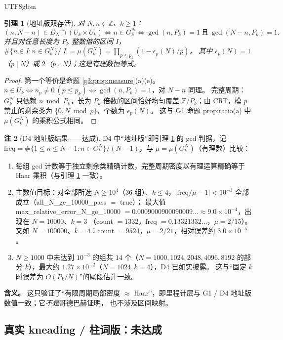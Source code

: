 \documentclass[11pt,a4paper]{article}
\newcommand{\Haar}{\mu}
\newcommand{\status}[1]{\par\noindent\fbox{\textbf{状态：#1}}\par\smallskip}
\theoremstyle{plain}
\newtheorem{lem}{引理}[section]
\theoremstyle{definition}
\newtheorem{rem}[lem]{注}
\begin{document}
\begin{CJK}{UTF8}{gbsn}
\begin{lem}[地址版双存活]\label{g3:lem:address}
对 $N,n\in\mathbb Z$、$k\ge1$：
\[
(n,N-n)\in D_N\cap(U_k\times U_k)\iff n\in G_k^N\iff \gcd(n,P_k)=1\ \text{且}\ \gcd(N-n,P_k)=1 .
\]
并且对任意长度为 $P_k$ 整数倍的区间 $I$，$\#\{n\in I:n\in G_k^N\}/|I|=\Haar(G_k^N)=\prod_{p\le p_k}(1-\epsilon_p(N)/p)$，
其中 $\epsilon_p(N)=1$（$p\mid N$）或 $2$（$p\nmid N$）；这是有理数恒等式。
\end{lem}
\status{已证（里程计层，无条件）}
\begin{proof}
第一个等价是命题 \ref{g3:prop:measure}(a)(e)。$n\in U_k\iff n_p\ne0\ (p\le p_k)\iff\gcd(n,P_k)=1$，对 $N-n$ 同理。
完整周期：$G_k^N$ 只依赖 $n\bmod P_k$，长为 $P_k$ 倍数的区间恰好均匀覆盖 $\mathbb Z/P_k$；由 CRT，模 $p$ 禁止的剩余类为 $\{0,N\bmod p\}$，个数为 $\epsilon_p(N)$。
这与 G1 命题 prop:ratio(a) 中 $\Haar(G_k^N)$ 的乘积公式相同。
\end{proof}

\begin{rem}[D4 地址版结果——达成]\label{g3:rem:d4odo}
D4 中“地址版”即引理 \ref{g3:lem:address} 的 gcd 判据，记 $\mathrm{freq}=\#\{1\le n\le N-1:n\in G_k^N\}/(N-1)$，与 $\Haar=\Haar(G_k^N)$（有理数）比较：
\begin{enumerate}[leftmargin=*,label=(\roman*)]
\item 每组 gcd 计数等于独立剩余类精确计数，完整周期密度以有理运算精确等于 Haar 乘积（与引理 \ref{g3:lem:address} 一致）。
\item 主数值目标：对全部所选 $N\ge10^4$（$36$ 组）、$k\le4$，$|\mathrm{freq}/\Haar-1|<10^{-3}$ 全部成立（all\_N\_ge\_10000\_pass $=$ true）；
最大值 max\_relative\_error\_N\_ge\_10000 $=0.0009000900090009\ldots\approx9.0\times10^{-4}$，出现在 $N=10000$、$k=3$
（count $=1332$，freq $=0.13321332\ldots$，$\Haar=2/15$）。又如 $N=100000$、$k=4$：count $=9524$，$\Haar=2/21$，相对误差约 $3.0\times10^{-5}$。
\item $N\ge1000$ 中未达到 $10^{-3}$ 的组共 $14$ 个（$N=1000,1024,2048,4096,8192$ 的部分 $k$），最大约 $1.27\times10^{-2}$（$N=1024,k=4$），D4 已如实披露。
这与“固定 $k$ 时误差为 $O(P_k/N)$”的尾段估计一致。
\end{enumerate}
\textbf{含义。} 这只验证了“有限周期局部密度 $\approx$ Haar”，即里程计层与 G1 / D4 地址版数值一致；它\emph{不是}哥德巴赫证明，
也不涉及区间映射。
\end{rem}

\subsection{真实 kneading / 柱词版：未达成}


\end{CJK}
\end{document}

